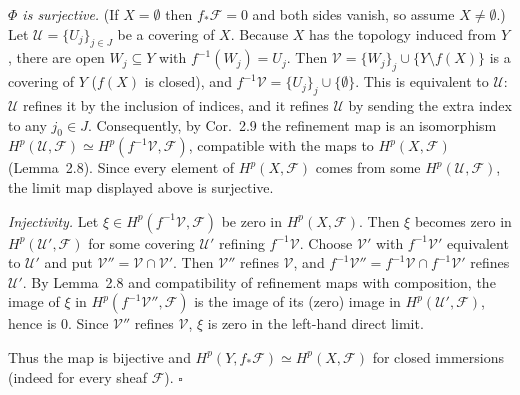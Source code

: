 \documentclass[11pt]{article}
\begin{document}
\emph{$\Phi$ is surjective.} (If $X=\emptyset$ then $f_*\mathcal F=0$ and both sides vanish, so assume $X\ne\emptyset$.) Let $\mathcal U=\{U_j\}_{j\in J}$ be a covering of $X$. Because $X$ has the topology induced from $Y$, there are open $W_j\subseteq Y$ with $f^{-1}(W_j)=U_j$. Then $\mathcal V=\{W_j\}_{j}\cup\{Y\setminus f(X)\}$ is a covering of $Y$ ($f(X)$ is closed), and $f^{-1}\mathcal V=\{U_j\}_j\cup\{\emptyset\}$. This is equivalent to $\mathcal U$: $\mathcal U$ refines it by the inclusion of indices, and it refines $\mathcal U$ by sending the extra index to any $j_0\in J$. Consequently, by Cor.~2.9 the refinement map is an isomorphism $H^p(\mathcal U,\mathcal F)\simeq H^p(f^{-1}\mathcal V,\mathcal F)$, compatible with the maps to $H^p(X,\mathcal F)$ (Lemma~2.8). Since every element of $H^p(X,\mathcal F)$ comes from some $H^p(\mathcal U,\mathcal F)$, the limit map displayed above is surjective.

\emph{Injectivity.} Let $\xi\in H^p(f^{-1}\mathcal V,\mathcal F)$ be zero in $H^p(X,\mathcal F)$. Then $\xi$ becomes zero in $H^p(\mathcal U',\mathcal F)$ for some covering $\mathcal U'$ refining $f^{-1}\mathcal V$. Choose $\mathcal V'$ with $f^{-1}\mathcal V'$ equivalent to $\mathcal U'$ and put $\mathcal V''=\mathcal V\cap\mathcal V'$. Then $\mathcal V''$ refines $\mathcal V$, and $f^{-1}\mathcal V''=f^{-1}\mathcal V\cap f^{-1}\mathcal V'$ refines $\mathcal U'$. By Lemma~2.8 and compatibility of refinement maps with composition, the image of $\xi$ in $H^p(f^{-1}\mathcal V'',\mathcal F)$ is the image of its (zero) image in $H^p(\mathcal U',\mathcal F)$, hence is $0$. Since $\mathcal V''$ refines $\mathcal V$, $\xi$ is zero in the left-hand direct limit.

Thus the map is bijective and $H^p(Y,f_*\mathcal F)\simeq H^p(X,\mathcal F)$ for closed immersions (indeed for every sheaf $\mathcal F$). \hfill$\square$
\end{document}
